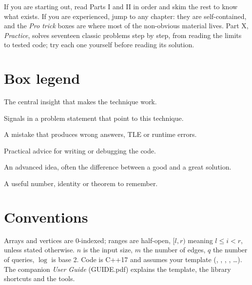 If you are starting out, read Parts I and II in order and skim the rest to know what exists. If you are
experienced, jump to any chapter: they are self-contained, and the \emph{Pro trick} boxes are where most of
the non-obvious material lives. Part X, \emph{Practice}, solves seventeen classic problems step by step, from
reading the limits to tested code; try each one yourself before reading its solution.

\section*{Box legend}

\begin{idea}The central insight that makes the technique work.\end{idea}
\begin{recognize}Signals in a problem statement that point to this technique.\end{recognize}
\begin{pitfall}A mistake that produces wrong answers, TLE or runtime errors.\end{pitfall}
\begin{tip}Practical advice for writing or debugging the code.\end{tip}
\begin{trick}An advanced idea, often the difference between a good and a great solution.\end{trick}
\begin{fact}A useful number, identity or theorem to remember.\end{fact}

\section*{Conventions}

Arrays and vertices are 0-indexed; ranges are half-open, $[l, r)$ meaning $l \le i < r$, unless stated otherwise.
$n$ is the input size, $m$ the number of edges, $q$ the number of queries, $\log$ is base 2. Code is C++17 and
assumes your template (, , , , \ldots). The companion
\emph{User Guide} (GUIDE.pdf) explains the template, the library shortcuts and the tools.
